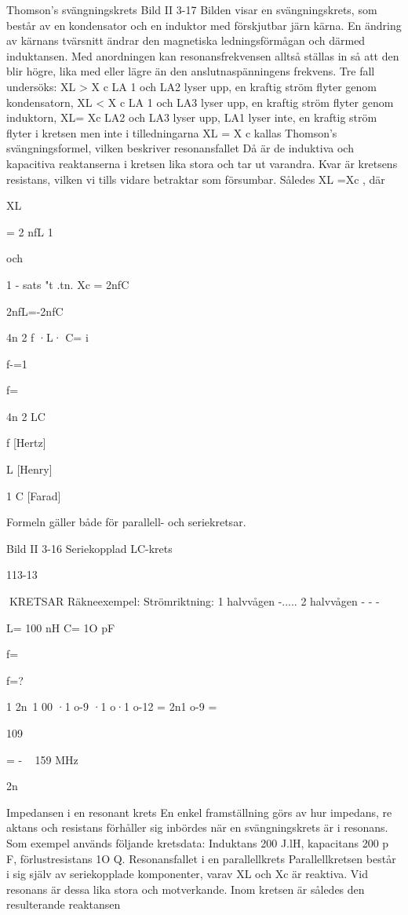 \documentclass[a4paper,twoside,twocolumn,openright]{book}
\begin{document}
{{{{{Thomson's svängningskrets
Bild II 3-17
Bilden visar en svängningskrets, som består
av en kondensator och en induktor med
förskjutbar järn kärna. En ändring av kärnans
tvärsnitt ändrar den magnetiska ledningsförmågan och därmed induktansen.
Med anordningen kan resonansfrekvensen alltså ställas in så att den blir högre, lika
med eller lägre än den anslutnaspänningens
frekvens. Tre fall undersöks:
XL > X c LA 1 och LA2 lyser upp, en kraftig
ström flyter genom kondensatorn,
XL < X c LA 1 och LA3 lyser upp, en kraftig
ström flyter genom induktorn,
XL= Xc LA2 och LA3 lyser upp, LA1 lyser
inte, en kraftig ström flyter i kretsen
men inte i tilledningarna
XL = X c kallas Thomson's svängningsformel, vilken beskriver resonansfallet
Då är de induktiva och kapacitiva
reaktanserna i kretsen lika stora och tar ut
varandra. Kvar är kretsens resistans, vilken
vi tills vidare betraktar som försumbar.
Således XL =Xc , där

XL

= 2 nfL
1

och

1 - sats
"t .tn.
Xc = 2nfC

2nfL=-2nfC

4n 2 f ·L· C= i

f-=1

f=

4n 2 LC

f [Hertz]

L [Henry]

1
C [Farad]

Formeln gäller både för parallell- och seriekretsar.

Bild II 3-16 Seriekopplad LC-krets

113-13

KRETSAR
Räkneexempel:
Strömriktning: 1 halvvågen -.....
2 halvvågen - - -

L= 100 nH C= 1O pF

f=

f=?

1
2n~1 00 ·1 o-9 ·1 o·1 o-12 = 2n1 o-9 =

109

= - ~ 159 MHz

2n

Impedansen i en resonant krets
En enkel framställning görs av hur impedans, re aktans och resistans förhåller sig
inbördes när en svängningskrets är i resonans. Som exempel används följande
kretsdata: Induktans 200 J.lH, kapacitans
200 p F, förlustresistans 1O Q.
Resonansfallet i en parallellkrets
Parallellkretsen består i sig själv av seriekopplade komponenter, varav XL och Xc
är reaktiva. Vid resonans är dessa lika
stora och motverkande. Inom kretsen är
således den resulterande reaktansen

}}}}}
\end{document}
